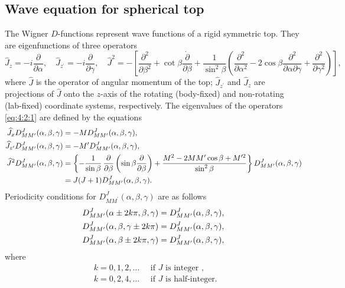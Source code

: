 \subsection{Wave equation for spherical top}
 The Wigner $D$-functions represent wave functions of a rigid symmetric top. They are eigenfunctions of three operators
\begin{equation}
\hat{J}_{z}=-i \frac{\partial}{\partial \alpha}, \quad \hat{J}_{z^{\prime}}=-i \frac{\partial}{\partial \gamma}, \quad \hat{J}^{2}=-\left[\frac{\partial^{2}}{\partial \beta^{2}}+\cot \beta \frac{\dot{\partial}}{\partial \beta}+\frac{1}{\sin ^{2} \beta}\left(\frac{\partial^{2}}{\partial \alpha^{2}}-2 \cos \beta \frac{\partial^{2}}{\partial \alpha \partial \gamma}+\frac{\partial^{2}}{\partial \gamma^{2}}\right)\right] ,\label{eq:4:2:1}
\end{equation}
where $\widehat{J}$ is the operator of angular momentum of the top; $\widehat{J}_{z^{\prime}}$ and $\widehat{J}_{z}$ are projections of $\widehat{J}$ onto the $z$-axis of the rotating (body-fixed) and non-rotating (lab-fixed) coordinate systems, respectively. The eigenvalues of the operators \eqref{eq:4:2:1} are defined by the equations
\begin{align}
\widehat{J}_{x} D_{M M^{\prime}}^{J}(\alpha, \beta, \gamma) & =-M D_{M M^{\prime}}^{J}(\alpha, \beta, \gamma) , \notag\\
\widehat{J}_{z^{\prime}} D_{M M^{\prime}}^{J}(\alpha, \beta, \gamma) & =-M^{\prime} D_{M M^{\prime}}^{J}(\alpha, \beta, \gamma),  \notag\\
\widehat{J}^{2} D_{M M^{\prime}}^{J}(\alpha, \beta, \gamma) & =\left\{-\frac{1}{\sin \beta} \, \frac{\partial}{\partial \beta}\left(\sin \beta \frac{\partial}{\partial \beta}\right)+\frac{M^{2}-2 M M^{\prime} \cos \beta+M^{\prime 2}}{\sin ^{2} \beta}\right\} D_{M M^{\prime}}^{J}(\alpha, \beta, \gamma)  \label{eq:4:2:2}\\
& =J(J+1) D_{M M^{\prime}}^{J}(\alpha, \beta, \gamma) .\notag
\end{align}
Periodicity conditions for $D_{M M^{\prime}}^{J}(\alpha, \beta, \gamma)$ are as follows
\begin{align}
& D_{M M^{\prime}}^{J}(\alpha \pm 2 k \pi, \beta, \gamma)=D_{M M^{\prime}}^{J}(\alpha, \beta, \gamma) , \notag\\
& D_{M M^{\prime}}^{J}(\alpha, \beta, \gamma \pm 2 k \pi)=D_{M M^{\prime}}^{J}(\alpha, \beta, \gamma)  ,\label{eq:4:2:3}\\
& D_{M M^{\prime}}^{J}(\alpha, \beta \pm 2 k \pi, \gamma)=D_{M M^{\prime}}^{J}(\alpha, \beta, \gamma) ,\notag
\end{align}
where
\[
\begin{aligned}
& k=0,1,2, \ldots \quad \text { if } J \text { is integer }, \\
& k=0,2,4, \ldots \quad \text { if } J \text { is half-integer. }
\end{aligned}
\]
